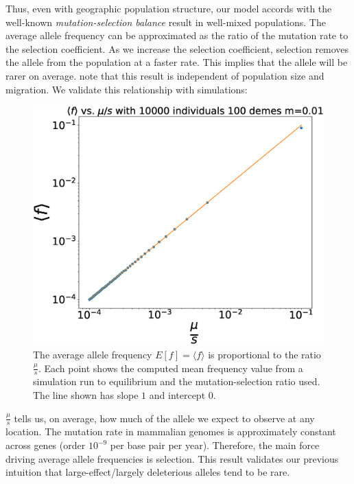 Thus, even with geographic population structure, our model accords with the well-known \textit{mutation-selection balance} result \cite{fisher_1930} in well-mixed populations. The average allele frequency can be approximated as the ratio of the mutation rate to the selection coefficient. As we increase the selection coefficient, selection removes the allele from the population at a faster rate. This implies that the allele will be rarer on average. note that this result is independent of population size and migration. We validate this relationship with simulations:

\begin{figure}[h]
    \centering
    \includegraphics[scale=0.4]{img/fig1.eps}
    \caption{The average allele frequency $E[f] = \langle f \rangle$ is proportional to the ratio $\frac{\mu}{s}$. Each point shows the computed mean frequency value from a simulation run to equilibrium and the mutation-selection ratio used. The line shown has slope $1$ and intercept $0$. }
    \label{fig:avg_freq}
\end{figure}

$\frac{\mu}{s}$ tells us, on average, how much of the allele we expect to observe at any location. The mutation rate in mammalian genomes is approximately constant across genes (order $10^{-9}$ per base pair per year). \cite{kumar_subramanian_2002} \cite{scally_2016} Therefore, the main force driving average allele frequencies is selection. This result validates our previous intuition that large-effect/largely deleterious alleles tend to be rare.

